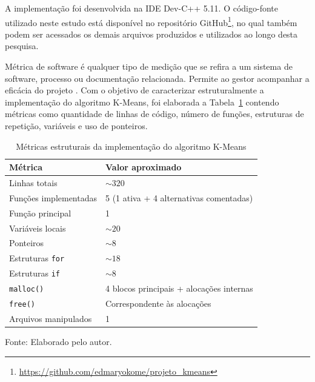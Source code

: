 \documentclass[10pt,a4paper,twocolumn]{article}
\begin{document}
A implementação foi desenvolvida na IDE Dev-C++ 5.11.  O código-fonte utilizado neste estudo está disponível no repositório GitHub\footnote{\url{https://github.com/edmaryokome/projeto_kmeans}},  no qual também podem ser acessados os demais arquivos produzidos e utilizados ao longo desta pesquisa.

Métrica de software é qualquer tipo de medição que se refira a um sistema de software, processo ou documentação relacionada. Permite ao gestor acompanhar a eficácia do projeto \cite{VETORAZZO2018}. Com o objetivo de caracterizar estruturalmente a implementação do algoritmo K-Means, foi elaborada a Tabela~\ref{tab:metricas_implementacao} contendo métricas como quantidade de linhas de código, número de funções, estruturas de repetição, variáveis e uso de ponteiros. 

\begin{table}[htbp]
\centering
\caption{Métricas estruturais da implementação do algoritmo K-Means}
\label{tab:metricas_implementacao}

\begin{tabular}{|p{3.2cm}|p{4.0cm}|}
\hline
\textbf{Métrica} & \textbf{Valor aproximado} \\ \hline

Linhas totais &
$\sim 320$ \\ \hline

Funções implementadas &
5 (1 ativa + 4 alternativas comentadas) \\ \hline

Função principal &
1 \\ \hline

Variáveis locais &
$\sim 20$ \\ \hline

Ponteiros &
$\sim 8$ \\ \hline

Estruturas \texttt{for} &
$\sim 18$ \\ \hline

Estruturas \texttt{if} &
$\sim 8$ \\ \hline

\texttt{malloc()} &
4 blocos principais + alocações internas \\ \hline

\texttt{free()} &
Correspondente às alocações \\ \hline

Arquivos manipulados &
1 \\ \hline

\end{tabular}

\smallskip
\footnotesize
Fonte: Elaborado pelo autor.

\end{table}
\end{document}
